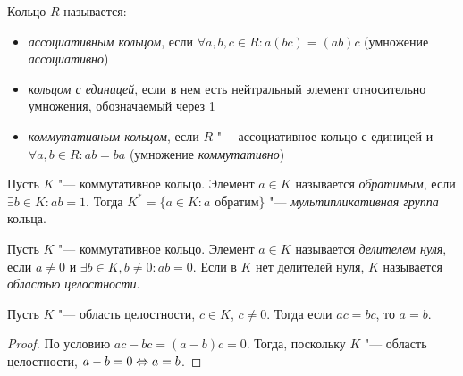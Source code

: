 \begin{reminder}
	Кольцо $R$ называется:
	\begin{itemize}
		\item \textit{ассоциативным кольцом}, если $\forall a, b, c \in R: a(bc) = (ab)c$ (умножение \textit{ассоциативно})
		\item \textit{кольцом с единицей}, если в нем есть нейтральный элемент относительно умножения, обозначаемый через 1
		\item \textit{коммутативным кольцом}, если $R$ "--- ассоциативное кольцо с единицей и $\forall a, b \in R: ab = ba$ (умножение \textit{коммутативно})
	\end{itemize}
\end{reminder}

\begin{reminder}
	Пусть $K$ "--- коммутативное кольцо. Элемент $a \in K$ называется \textit{обратимым}, если $\exists b \in K: ab = 1$. Тогда $K^* = \{a \in K: a \text{ обратим}\}$ "--- \textit{мультипликативная группа} кольца.
\end{reminder}

\begin{definition}
	Пусть $K$ "--- коммутативное кольцо. Элемент $a \in K$ называется \textit{делителем нуля}, если $a \ne 0$ и $\exists b \in K, b \ne 0: ab = 0$. Если в $K$ нет делителей нуля, $K$ называется \textit{областью целостности}.
\end{definition}

\begin{proposition}
	Пусть $K$ "--- область целостности, $c \in K$, $c \ne 0$. Тогда если $ac = bc$, то $a = b$.
\end{proposition}

\begin{proof}
	По условию $ac - bc = (a - b)c = 0$. Тогда, поскольку $K$ "--- область целостности, $a - b = 0 \Leftrightarrow a = b$.
\end{proof}